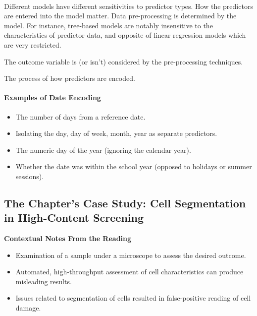 \documentclass[../main.tex]{subfiles}
\begin{document}
\paragraph{}
    Different models have different sensitivities to predictor types. How the predictors are entered 
    into the model matter. Data pre-processing is determined by the model. For instance, tree-based models
    are notably insensitive to the characteristics of predictor data, and opposite of linear regression 
    models which are very restricted.

    \begin{definition}
        The outcome variable is (or isn't) considered by the pre-processing techniques.
    \end{definition}

    \begin{definition}
        The process of how predictors are encoded.
    \end{definition}

\paragraph{Examples of Date Encoding}
    \begin{itemize}
        \item The number of days from a reference date.
        \item Isolating the day, day of week, month, year as separate predictors.
        \item The numeric day of the year (ignoring the calendar year).
        \item Whether the date was within the school year (opposed to holidays or summer sessions).
    \end{itemize}


\subsection{The Chapter's Case Study: Cell Segmentation in High-Content Screening}

    \textbf{Contextual Notes From the Reading}
    \begin{itemize}
        \item Examination of a sample under a microscope to assess the desired outcome.
        \item Automated, high-throughput assessment of cell characteristics can produce misleading results.
        \item Issues related to segmentation of cells resulted in false-positive reading of cell damage.
    \end{itemize}
\end{document}
